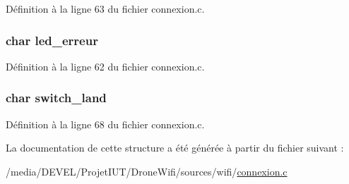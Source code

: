 Définition à la ligne 63 du fichier connexion.\-c.

\hypertarget{structetat__commandes_a3aaef46c6ca19a2afb10c86c5300d067}{
\subsubsection[{led\-\_\-erreur}]{\setlength{\rightskip}{0pt plus 5cm}char led\-\_\-erreur}}\label{structetat__commandes_a3aaef46c6ca19a2afb10c86c5300d067}


Définition à la ligne 62 du fichier connexion.\-c.

\hypertarget{structetat__commandes_af0fce6b96a884e05a43ec95b76d1f6db}{
\subsubsection[{switch\-\_\-land}]{\setlength{\rightskip}{0pt plus 5cm}char switch\-\_\-land}}\label{structetat__commandes_af0fce6b96a884e05a43ec95b76d1f6db}


Définition à la ligne 68 du fichier connexion.\-c.



La documentation de cette structure a été générée à partir du fichier suivant \-:\begin{DoxyCompactItemize}
\item 
/media/\-D\-E\-V\-E\-L/\-Projet\-I\-U\-T/\-Drone\-Wifi/sources/wifi/\hyperlink{connexion_8c}{connexion.\-c}\end{DoxyCompactItemize}
